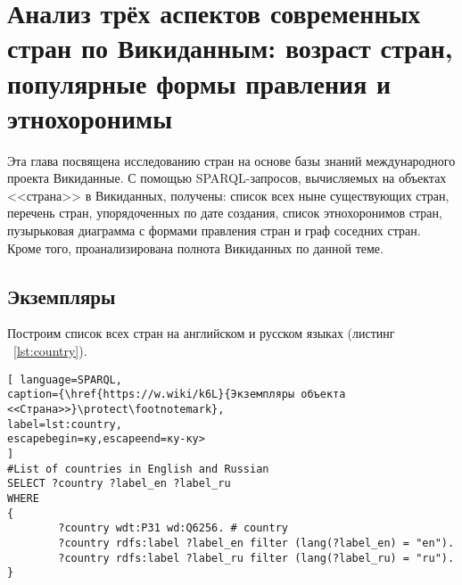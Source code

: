 \chapter{Анализ трёх аспектов современных стран по Викиданным: возраст стран, популярные формы правления и этнохоронимы}
\label{ch:country}

Эта глава посвящена исследованию стран на основе базы знаний международного проекта Викиданные. С помощью SPARQL-запросов, вычисляемых на объектах <<страна>> в Викиданных, получены: список всех ныне существующих стран, перечень стран, упорядоченных по дате создания, список этнохоронимов стран, пузырьковая диаграмма с формами правления стран и граф соседних стран. Кроме того, проанализирована полнота Викиданных по данной теме.

\begin{marginfigure}[0.0cm]
	{
		\setlength{\fboxsep}{0pt}%
		\setlength{\fboxrule}{1pt}%
	}
	\caption{
		Высокая степень заполнения по числу свойств объекта Викиданных \href{https://www.wikidata.org/wiki/Q6256}{Страна (Q6256)}.  Данные получены с помощью сервиса \href{https://prowd.id/dashboards/86b6f91a8131/profile}{ProWD.id}, 2020 год. \emph{Коэффициент Джини равен 0.091.}
	}%
	\label{fig:ProWD_country}%
\end{marginfigure}


\section{Экземпляры}

Построим список всех стран на английском и русском языках (листинг ~\ref{lst:country}).

\begin{lstlisting}[ language=SPARQL, 
caption={\href{https://w.wiki/k6L}{Экземпляры объекта <<Страна>>}\protect\footnotemark},
label=lst:country, 
escapebegin=ку,escapeend=ку-ку>
]
#List of countries in English and Russian
SELECT ?country ?label_en ?label_ru
WHERE
{
		?country wdt:P31 wd:Q6256. # country
		?country rdfs:label ?label_en filter (lang(?label_en) = "en").
		?country rdfs:label ?label_ru filter (lang(?label_ru) = "ru").
}
\end{lstlisting}


